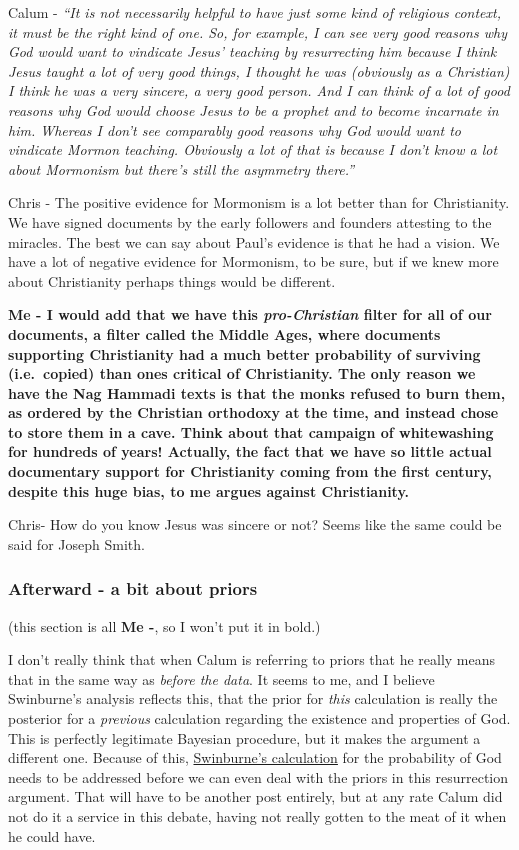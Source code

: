 \documentclass{tufte-book}
\begin{document}
Calum - \emph{``It is not necessarily helpful to have just some kind of
religious context, it must be the right kind of one. So, for example, I
can see very good reasons why God would want to vindicate Jesus'
teaching by resurrecting him because I think Jesus taught a lot of very
good things, I thought he was (obviously as a Christian) I think he was
a very sincere, a very good person. And I can think of a lot of good
reasons why God would choose Jesus to be a prophet and to become
incarnate in him. Whereas I don't see comparably good reasons why God
would want to vindicate Mormon teaching. Obviously a lot of that is
because I don't know a lot about Mormonism but there's still the
asymmetry there.''}

Chris - The positive evidence for Mormonism is a lot better than for
Christianity. We have signed documents by the early followers and
founders attesting to the miracles. The best we can say about Paul's
evidence is that he had a vision. We have a lot of negative evidence for
Mormonism, to be sure, but if we knew more about Christianity perhaps
things would be different.

\textbf{Me - I would add that we have this \emph{pro-Christian} filter
for all of our documents, a filter called the Middle Ages, where
documents supporting Christianity had a much better probability of
surviving (i.e.~copied) than ones critical of Christianity. The only
reason we have the Nag Hammadi texts is that the monks refused to burn
them, as ordered by the Christian orthodoxy at the time, and instead
chose to store them in a cave. Think about that campaign of whitewashing
for hundreds of years! Actually, the fact that we have so little actual
documentary support for Christianity coming from the first century,
despite this huge bias, to me argues against Christianity.}

Chris- How do you know Jesus was sincere or not? Seems like the same
could be said for Joseph Smith.

\subsubsection{Afterward - a bit about
priors}\label{afterward-abitaboutpriors}

(this section is all \textbf{Me -}, so I won't put it in bold.)

I don't really think that when Calum is referring to priors that he
really means that in the same way as \emph{before the data}. It seems to
me, and I believe Swinburne's analysis reflects this, that the prior for
\emph{this} calculation is really the posterior for a \emph{previous}
calculation regarding the existence and properties of God. This is
perfectly legitimate Bayesian procedure, but it makes the argument a
different one. Because of this,
\href{http://ndpr.nd.edu/news/23553-the-resurrection-of-god-incarnate/}{Swinburne's
calculation} for the probability of God needs to be addressed before we
can even deal with the priors in this resurrection argument. That will
have to be another post entirely, but at any rate Calum did not do it a
service in this debate, having not really gotten to the meat of it when
he could have.
\end{document}
